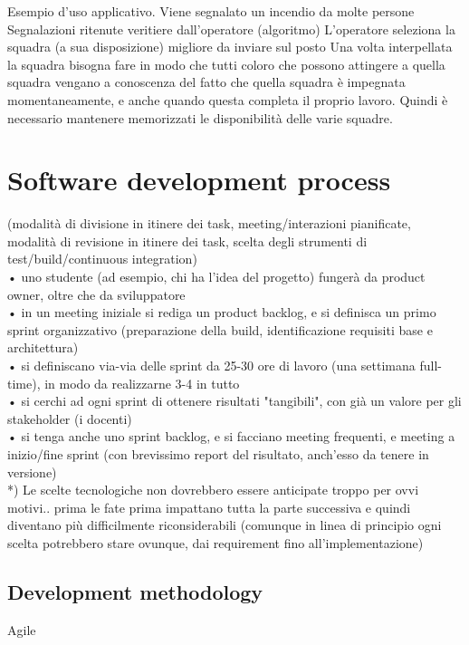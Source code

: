 \documentclass[a4paper,12pt]{report}
\begin{document}
Esempio d’uso applicativo.
Viene segnalato un incendio da molte persone 
Segnalazioni ritenute veritiere dall’operatore (algoritmo)
L’operatore seleziona la squadra (a sua disposizione) migliore da inviare sul posto 
Una volta interpellata la squadra bisogna fare in modo che tutti coloro che possono attingere a quella squadra vengano a conoscenza del fatto che quella squadra è impegnata momentaneamente, e anche quando questa completa il proprio lavoro. Quindi è necessario mantenere memorizzati le disponibilità delle varie squadre.\\


\chapter{Software development process}

(modalità di divisione in itinere dei task, meeting/interazioni pianificate, modalità di revisione in itinere dei task, scelta degli strumenti di test/build/continuous integration)\\
•	uno studente (ad esempio, chi ha l'idea del progetto) fungerà da product owner, oltre che da sviluppatore\\
•	in un meeting iniziale si rediga un product backlog, e si definisca un primo sprint organizzativo (preparazione della build, identificazione requisiti base e architettura)\\
•	si definiscano via-via delle sprint da 25-30 ore di lavoro (una settimana full-time), in modo da realizzarne 3-4 in tutto\\
•	si cerchi ad ogni sprint di ottenere risultati "tangibili", con già un valore per gli stakeholder (i docenti)\\
•	si tenga anche uno sprint backlog, e si facciano meeting frequenti, e meeting a inizio/fine sprint (con brevissimo report del risultato, anch'esso da tenere in versione)\\

*) Le scelte tecnologiche non dovrebbero essere anticipate troppo per ovvi motivi.. prima le fate prima impattano tutta la parte successiva e quindi diventano più difficilmente riconsiderabili (comunque in linea di principio ogni scelta potrebbero stare ovunque, dai requirement fino all'implementazione) \\



\section{Development methodology}
Agile
\end{document}
